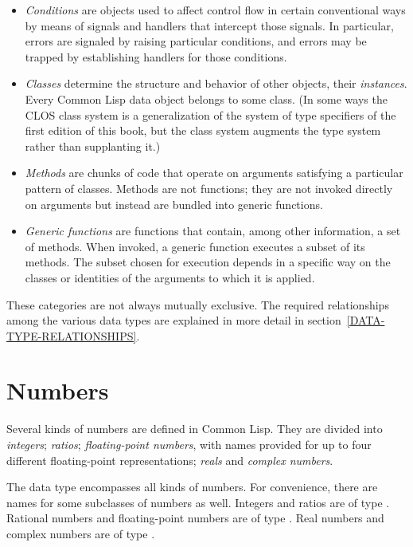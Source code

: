 \begin{itemize}
\item
\emph{Conditions} are objects used to affect control flow in certain
conventional ways by means of signals and handlers that intercept those signals.
In particular, errors are signaled by raising particular conditions,
and errors may be trapped by establishing handlers for those conditions.

\item
\emph{Classes} determine the structure and behavior of other
objects, their \emph{instances}.  Every Common Lisp data object
belongs to some class.  (In some ways the CLOS class system is
a generalization of the system of type specifiers of the first edition of this book,
but the class system augments the type system rather than supplanting it.)

\item
\emph{Methods} are chunks of code that operate on arguments
satisfying a particular pattern of classes.  Methods are
not functions; they are not invoked directly on arguments
but instead are bundled into generic functions.

\item
\emph{Generic functions} are functions that contain, among other
information, a set of methods.  When invoked, a generic function
executes a subset of its methods.  The subset chosen for execution
depends in a specific way on the classes or identities of the arguments
to which it is applied.
\end{itemize}

These categories are not always mutually exclusive.
The required relationships among the various data types are
explained in more detail in section~\ref{DATA-TYPE-RELATIONSHIPS}.

\section{Numbers}

Several kinds of numbers are defined in Common Lisp.
They are divided into \emph{integers}; \emph{ratios};
\emph{floating-point numbers}, with names provided for
up to four different floating-point representations; \emph{reals} and
\emph{complex numbers}.

The  data type encompasses all kinds of
numbers.  For convenience, there are names for some
subclasses of numbers as well.  Integers and ratios are of
type .  Rational numbers and floating-point
numbers are of type .  Real numbers and complex
numbers are of type .

